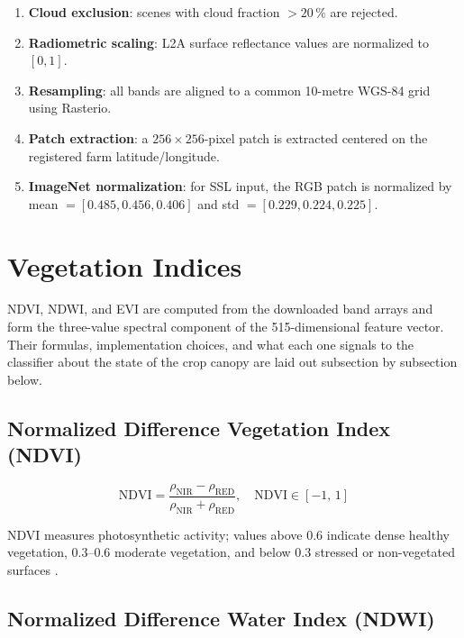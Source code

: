 \documentclass[12pt,a4paper,oneside]{report}
\begin{document}
\begin{enumerate}
  \item \textbf{Cloud exclusion}: scenes with cloud fraction $> 20\,\%$ are rejected.
  \item \textbf{Radiometric scaling}: L2A surface reflectance values are normalized to $[0,1]$.
  \item \textbf{Resampling}: all bands are aligned to a common 10-metre WGS-84 grid
        using Rasterio.
  \item \textbf{Patch extraction}: a $256\times256$-pixel patch is extracted centered
        on the registered farm latitude/longitude.
  \item \textbf{ImageNet normalization}: for SSL input, the RGB patch is normalized
        by mean $= [0.485, 0.456, 0.406]$ and std $= [0.229, 0.224, 0.225]$.
\end{enumerate}

\section{Vegetation Indices}
\label{sec:indices}

NDVI, NDWI, and EVI are computed from the downloaded band arrays and form the three-value spectral component of the 515-dimensional feature vector. Their formulas, implementation choices, and what each one signals to the classifier about the state of the crop canopy are laid out subsection by subsection below.

\subsection{Normalized Difference Vegetation Index (NDVI)}

\begin{equation}
\mathrm{NDVI} = \frac{\rho_\mathrm{NIR} - \rho_\mathrm{RED}}
                     {\rho_\mathrm{NIR} + \rho_\mathrm{RED}}, \quad
\mathrm{NDVI} \in [-1,\,1]
\label{eq:ndvi}
\end{equation}

NDVI measures photosynthetic activity; values above 0.6 indicate dense healthy
vegetation, 0.3--0.6 moderate vegetation, and below 0.3 stressed or non-vegetated
surfaces \cite{tucker1979red}.

\subsection{Normalized Difference Water Index (NDWI)}
\end{document}
